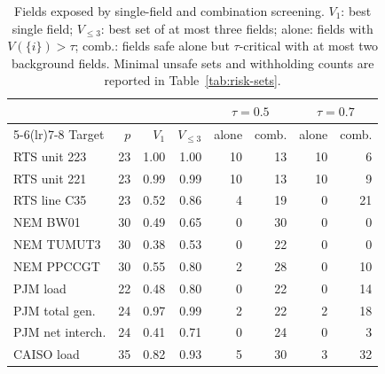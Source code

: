 \begin{table}[!t]
\centering\small
\caption{Fields exposed by single-field and combination screening. $V_1$: best single field; $V_{\le3}$: best set of at most three fields; alone: fields with $V(\{i\})>\tau$; comb.: fields safe alone but $\tau$-critical with at most two background fields. Minimal unsafe sets and withholding counts are reported in Table~\ref{tab:risk-sets}.}\label{tab:risk}
\setlength{\tabcolsep}{4.5pt}
\begin{tabular}{lrrr rrrr}
\toprule
 & & & & \multicolumn{2}{c}{$\tau=0.5$} & \multicolumn{2}{c}{$\tau=0.7$}\\
\cmidrule(lr){5-6}\cmidrule(lr){7-8}
Target & $p$ & $V_1$ & $V_{\le3}$ & alone & comb. & alone & comb.\\
\midrule
RTS unit 223 & 23 & 1.00 & 1.00 & 10 & 13 & 10 & 6 \\
RTS unit 221 & 23 & 0.99 & 0.99 & 10 & 13 & 10 & 9 \\
RTS line C35 & 23 & 0.52 & 0.86 & 4 & 19 & 0 & 21 \\
NEM BW01 & 30 & 0.49 & 0.65 & 0 & 30 & 0 & 0 \\
NEM TUMUT3 & 30 & 0.38 & 0.53 & 0 & 22 & 0 & 0 \\
NEM PPCCGT & 30 & 0.55 & 0.80 & 2 & 28 & 0 & 10 \\
PJM load & 22 & 0.48 & 0.80 & 0 & 22 & 0 & 14 \\
PJM total gen. & 24 & 0.97 & 0.99 & 2 & 22 & 2 & 18 \\
PJM net interch. & 24 & 0.41 & 0.71 & 0 & 24 & 0 & 3 \\
CAISO load & 35 & 0.82 & 0.93 & 5 & 30 & 3 & 32 \\
\bottomrule
\end{tabular}
\end{table}
